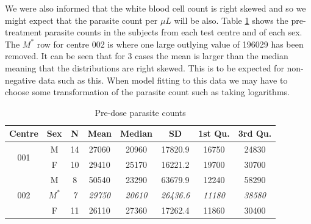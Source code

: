 We were also informed that the white blood cell count is right skewed and so we might expect that the parasite count per $\mu L$ will be also. Table \ref{predose} shows the pre-treatment parasite counts in the subjects from each test centre and of each sex. The $M^*$ row for centre 002 is where one large outlying value of 196029 has been removed. It can be seen that for 3 cases the mean is larger than the median meaning that the distributions are right skewed. This is to be expected for non-negative data such as this. When model fitting to this data we may have to choose some transformation of the parasite count such as taking logarithms.
\begin{table}[h]
\centering
\caption{Pre-dose parasite counts}\label{predose}
\begin{tabular}{|cc|cccccc|}
\hline
Centre&Sex&N&Mean&Median&SD&1st Qu.&3rd Qu.\\\hline
\multirow{2}{*}{001}&M&14&27060&20960&17820.9&16750&24830\\
&F&10&29410&25170&16221.2&19700&30700\\\hline
\multirow{3}{*}{002}&M&8&50540&23290&63679.9&12240&58290\\
&$M^*$&\textit{7}&\textit{29750}&\textit{20610}&\textit{26436.6}&\textit{11180}&\textit{38580}\\
&F&11&26110&27360&17262.4&11860&30400\\\hline
\end{tabular}
\end{table}
